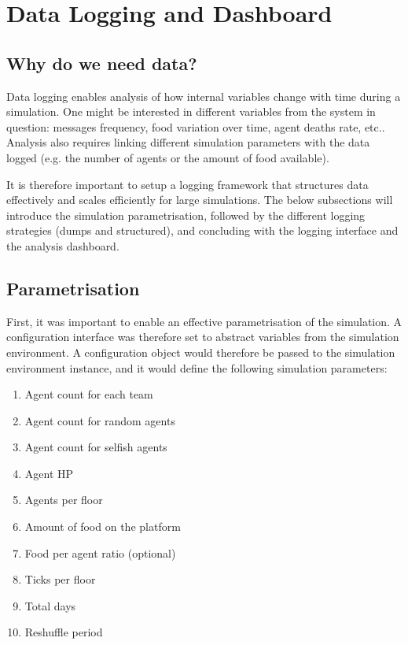 \chapter{Data Logging and Dashboard}\label{data_logging}

\section{Why do we need data?}

Data logging enables analysis of how internal variables change with time during a simulation. One might be interested in different variables from the system in question: messages frequency, food variation over time, agent deaths rate, etc.. Analysis also requires linking different simulation parameters with the data logged (e.g. the number of agents or the amount of food available). 

It is therefore important to setup a logging framework that structures data effectively and scales efficiently for large simulations. The below subsections will introduce the simulation parametrisation, followed by the different logging strategies (dumps and structured), and concluding with the logging interface and the analysis dashboard.

\section{Parametrisation}

First, it was important to enable an effective parametrisation of the simulation. A configuration interface was therefore set to abstract variables from the simulation environment. A configuration object would therefore be passed to the simulation environment instance, and it would define the following simulation parameters:

\begin{multicols}{2}
    \begin{enumerate}
        \item Agent count for each team
        \item Agent count for random agents
        \item Agent count for selfish agents
        \item Agent HP
        \item Agents per floor
        \item Amount of food on the platform
        \item Food per agent ratio (optional)
        \item Ticks per floor
        \item Total days
        \item Reshuffle period
    \end{enumerate}
\end{multicols}

